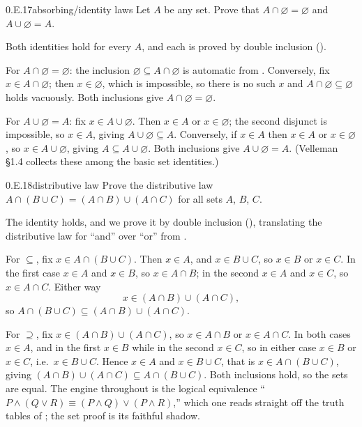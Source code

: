 \documentclass[main.tex]{subfiles}
\begin{document}
\begin{Exercise}{0.E.17}{absorbing/identity laws}
Let $A$ be any set. Prove that $A\cap\varnothing=\varnothing$ and $A\cup\varnothing=A$.
\end{Exercise}
\begin{Solution}
Both identities hold for every $A$, and each is proved by double inclusion ().

For $A\cap\varnothing=\varnothing$: the inclusion $\varnothing\subseteq A\cap\varnothing$ is automatic
from . Conversely, fix $x\in A\cap\varnothing$; then $x\in\varnothing$, which is
impossible, so there is no such $x$ and $A\cap\varnothing\subseteq\varnothing$ holds vacuously. Both
inclusions give $A\cap\varnothing=\varnothing$.

For $A\cup\varnothing=A$: fix $x\in A\cup\varnothing$. Then $x\in A$ or $x\in\varnothing$; the second
disjunct is impossible, so $x\in A$, giving $A\cup\varnothing\subseteq A$. Conversely, if $x\in A$
then $x\in A$ or $x\in\varnothing$, so $x\in A\cup\varnothing$, giving $A\subseteq A\cup\varnothing$.
Both inclusions give $A\cup\varnothing=A$. (Velleman \S1.4 collects these among the basic set
identities.)
\end{Solution}

\begin{Exercise}{0.E.18}{distributive law}
Prove the distributive law $A\cap(B\cup C)=(A\cap B)\cup(A\cap C)$ for all sets $A$, $B$, $C$.
\end{Exercise}
\begin{Solution}
The identity holds, and we prove it by double inclusion (), translating the distributive
law for ``and'' over ``or'' from .

For $\subseteq$, fix $x\in A\cap(B\cup C)$. Then $x\in A$, and $x\in B\cup C$, so $x\in B$ or $x\in C$.
In the first case $x\in A$ and $x\in B$, so $x\in A\cap B$; in the second $x\in A$ and $x\in C$, so
$x\in A\cap C$. Either way
\[
x\in(A\cap B)\cup(A\cap C),
\]
so $A\cap(B\cup C)\subseteq(A\cap B)\cup(A\cap C)$.

For $\supseteq$, fix $x\in(A\cap B)\cup(A\cap C)$, so $x\in A\cap B$ or $x\in A\cap C$. In both cases
$x\in A$, and in the first $x\in B$ while in the second $x\in C$, so in either case $x\in B$ or $x\in
C$, i.e.\ $x\in B\cup C$. Hence $x\in A$ and $x\in B\cup C$, that is $x\in A\cap(B\cup C)$, giving
$(A\cap B)\cup(A\cap C)\subseteq A\cap(B\cup C)$. Both inclusions hold, so the sets are equal. The
engine throughout is the logical equivalence ``$P\wedge(Q\vee R)\equiv(P\wedge Q)\vee(P\wedge R)$,''
which one reads straight off the truth tables of ; the set proof is its faithful shadow.
\end{Solution}
\end{document}
